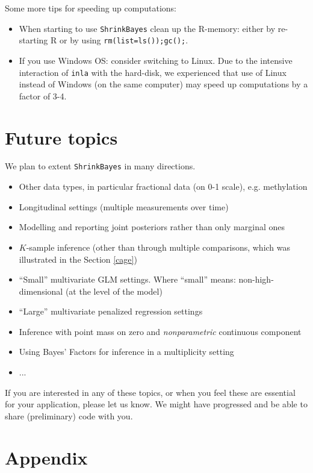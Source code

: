 \documentclass[11pt]{article}
\newcommand{\para}{\bigskip\noindent}
\begin{document}
\para
Some more tips for speeding up computations:
\begin{itemize}
\item When starting to use {\tt ShrinkBayes} clean up the R-memory: either by re-starting R
or by using {\tt rm(list=ls());gc();}.
\item If you use Windows OS: consider switching to Linux. Due to the intensive interaction of {\tt inla} with the hard-disk,
we experienced that use of Linux instead of Windows (on the same computer) may speed up computations by a factor of 3-4.


\end{itemize}


\section{Future topics}
We plan to extent {\tt ShrinkBayes} in many directions.
\begin{itemize}
\item Other data types, in particular fractional data (on 0-1 scale), e.g. methylation
\item Longitudinal settings (multiple measurements over time)
\item Modelling and reporting joint posteriors rather than only marginal ones
\item $K$-sample inference (other than through multiple comparisons, which was illustrated in the Section \ref{cage})
\item ``Small'' multivariate GLM settings. Where ``small'' means: non-high-dimensional (at the level of the model)
\item ``Large'' multivariate penalized regression settings
\item Inference with point mass on zero and {\it nonparametric} continuous component
\item Using Bayes' Factors for inference in a multiplicity setting
\item ...
\end{itemize}
If you are interested in any of these topics, or when you feel these are essential for your application, please let us know.
We might have progressed and be able to share (preliminary) code with you.

\section{Appendix}\label{appendix}
\end{document}
